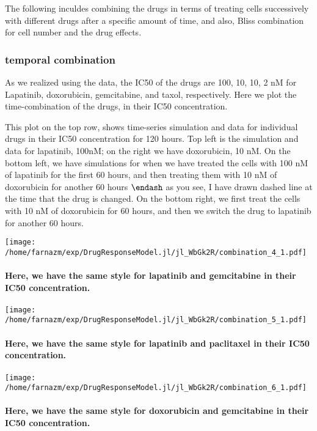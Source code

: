 \documentclass[12pt,a4paper]{article}
\begin{document}
The following inculdes combining the drugs in terms of treating cells successively with different drugs after a specific amount of time, and also, Bliss combination for cell number and the drug effects.





\subsubsection{temporal combination}
As we realized using the data, the IC50 of the drugs are 100, 10, 10, 2 nM for Lapatinib, doxorubicin, gemcitabine, and taxol, respectively. Here we plot the time-combination of the drugs, in their IC50 concentration.

This plot on the top row, shows time-series simulation and data for individual drugs in their IC50 concentration for 120 hours. Top left is the simulation and data for lapatinib, 100nM; on the right we have doxorubicin, 10 nM. On the bottom left, we have simulations for when we have treated the cells with 100 nM of lapatinib for the first 60 hours, and then treating them with 10 nM of doxorubicin for another 60 hours \ensuremath{\endash} as you see, I have drawn dashed line at the time that the drug is changed. On the bottom right, we first treat the cells with 10 nM of doxorubicin for 60 hours, and then we switch the drug to lapatinib for another 60 hours.


\texttt{[image: /home/farnazm/exp/DrugResponseModel.jl/jl\_WbGk2R/combination\_4\_1.pdf]}

\paragraph{Here, we have the same style for lapatinib and gemcitabine in their IC50 concentration.}

\texttt{[image: /home/farnazm/exp/DrugResponseModel.jl/jl\_WbGk2R/combination\_5\_1.pdf]}

\paragraph{Here, we have the same style for lapatinib and paclitaxel in their IC50 concentration.}

\texttt{[image: /home/farnazm/exp/DrugResponseModel.jl/jl\_WbGk2R/combination\_6\_1.pdf]}

\paragraph{Here, we have the same style for doxorubicin and gemcitabine in their IC50 concentration.}
\end{document}
